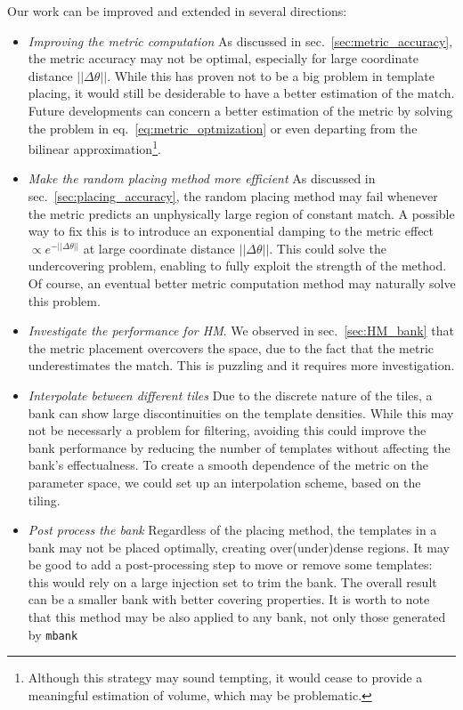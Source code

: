 \documentclass[twocolumn,showpacs,preprintnumbers,nofootinbib,prd,
superscriptaddress,10pt]{revtex4-2}
\newcommand{\mbank}{\texttt{mbank}}
\begin{document}
Our work can be improved and extended in several directions:
\begin{itemize}
	\item {\it Improving the metric computation} As discussed in sec.~\ref{sec:metric_accuracy}, the metric accuracy may not be optimal, especially for large coordinate distance $||\Delta\theta||$. While this has proven not to be a big problem in template placing, it would still be desiderable to have a better estimation of the match. Future developments can concern a better estimation of the metric by solving the problem in eq.~\eqref{eq:metric_optmization} or even departing from the bilinear approximation\footnote{
Although this strategy may sound tempting, it would cease to provide a meaningful estimation of volume, which may be problematic.}.
	
	\item {\it Make the random placing method more efficient} As discussed in sec.~\ref{sec:placing_accuracy}, the random placing method may fail whenever the metric predicts an unphysically large region of constant match. A possible way to fix this is to introduce an exponential damping to the metric effect $\propto e^{-||\Delta\theta||}$ at large coordinate distance $||\Delta\theta||$. This could solve the undercovering problem, enabling to fully exploit the strength of the method.
	Of course, an eventual better metric computation method may naturally solve this problem.
	
	\item {\it Investigate the performance for HM}. We observed in sec.~\ref{sec:HM_bank} that the metric placement overcovers the space, due to the fact that the metric underestimates the match. This is puzzling and it requires more investigation.
	
	\item {\it Interpolate between different tiles} Due to the discrete nature of the tiles, a bank can show large discontinuities on the template densities. While this may not be necessarly a problem for filtering, avoiding this could improve the bank performance by reducing the number of templates without affecting the bank's effectualness. To create a smooth dependence of the metric on the parameter space, we could set up an interpolation scheme, based on the tiling.
	
	\item {\it Post process the bank} Regardless of the placing method, the templates in a bank may not be placed optimally, creating over(under)dense regions. It may be good to add a post-processing step to move or remove some templates: this would rely on a large injection set to trim the bank. The overall result can be a smaller bank with better covering properties.
	It is worth to note that this method may be also applied to any bank, not only those generated by \mbank 
\end{itemize}
\end{document}
